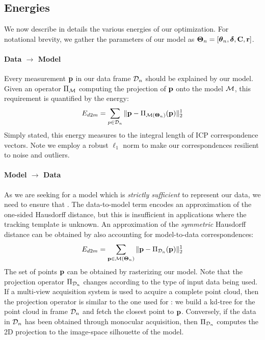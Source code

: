 \subsection{Energies}
We now describe in details the various energies of our optimization. For notational brevity, we gather the parameters of our model as $\boldsymbol{\Theta}_n=[\boldsymbol{\theta}_n, \boldsymbol{\delta}, \mathbf{C}, \mathbf{r}]$.

\paragraph{Data $\rightarrow$ Model}
Every measurement $\mathbf{p}$ in our data frame $\mathcal{D}_n$ should be explained by our model. Given an operator $\Pi_{\mathcal{M}}$ computing the projection of $\mathbf{p}$ onto the model $\mathcal{M}$, this requirement is quantified by the energy:
% 
\begin{equation}
E_{d2m} = \sum_{p \in \mathcal{D}_n} \| \mathbf{p} - \Pi_{\mathcal{M}(\boldsymbol{\Theta}_n)}(\mathbf{p})\|_2^1
\label{eq:d2m}
\end{equation}
% 
Simply stated, this energy measures to the integral length of ICP correspondence vectors. Note we employ a robust $\ell_1$ norm to make our correspondences resilient to noise and outliers. 

\paragraph{Model $\rightarrow$ Data}
As we are seeking for a model which is \emph{strictly sufficient} to represent our data, we need to ensure that . The data-to-model term encodes an approximation of the one-sided Hausdorff distance, but this is insufficient in applications where the tracking template is unknown. An approximation of the \emph{symmetric} Hausdorff distance can be obtained by also accounting for model-to-data correspondences:
\begin{equation}
E_{d2m} = \sum_{\mathbf{p} \in \mathcal{M}(\boldsymbol{\Theta}_n)} \| \mathbf{p} - \Pi_{\mathcal{D}_n}(\mathbf{p})\|_2^1
\label{eq:m2d}
\end{equation}
The set of points $\mathbf{p}$ can be obtained by rasterizing our model. Note that the projection operator $\Pi_{\mathcal{D}_n}$ changes according to the type of input data being used. If a multi-view acquisition system is used to acquire a complete point cloud, then the projection operator is similar to the one used for : we build a kd-tree for the point cloud in frame $\mathcal{D}_n$ and fetch the closest point to $\mathbf{p}$. Conversely, if the data in $\mathcal{D}_n$ has been obtained through monocular acquisition, then $\Pi_{\mathcal{D}_n}$ computes the 2D projection to the image-space silhouette of the model.

